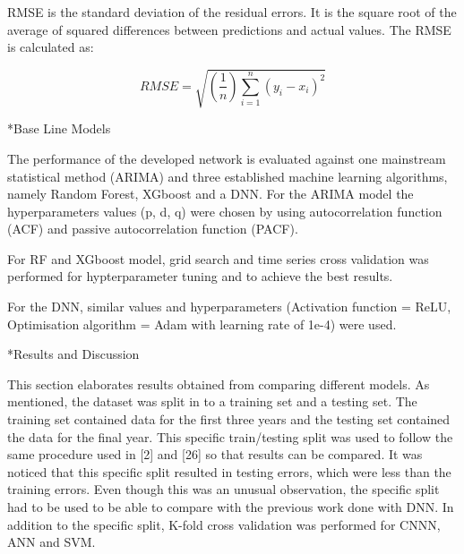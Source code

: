 \documentclass[twocolumn, a4paper,10pt]{article}
\makeatletter
\renewcommand\section{\@startsection{section}{1}{\z@}{0.25cm}{0.1cm}{\normalfont\large\bfseries}}
\renewcommand\subsubsection{\@startsection{subsection}{1}{\z@}{0.2cm}{0.1cm}{\normalfont\normalsize\itshape}}
\makeatother
\begin{document}
RMSE is the standard deviation of the residual errors. It is the square root of the average of squared differences between predictions and actual values. The RMSE is calculated as:

$$ RMSE = \sqrt{(\frac{1}{n})\sum_{i=1}^{n}(y_{i} - x_{i})^{2}} $$

\subsubsection*{Base Line Models}

The performance of the developed network is evaluated against one mainstream statistical method (ARIMA) and three established machine learning algorithms, namely Random Forest, XGboost and a DNN.
For the ARIMA model the hyperparameters values (p, d, q) were chosen by using autocorrelation function (ACF) and passive autocorrelation function (PACF).

For RF and XGboost model, grid search and time series cross validation was performed for hypterparameter tuning and to achieve the best results.

For the DNN, similar values and hyperparameters (Activation function = ReLU, Optimisation algorithm = Adam with learning rate of 1e-4) were used.


\section*{Results and Discussion}

This section elaborates results obtained from comparing different models. As mentioned, the dataset was split in to a training set and a testing set. The training set contained data for the first three years and the testing set contained the data for the final year. This specific train/testing split was used to follow the same procedure used in [2] and [26] so that results can be compared. It was noticed that this specific split resulted in testing errors, which were less than the training errors. Even though this was an unusual observation, the specific split had to be used to be able to compare with the previous work done with DNN. In addition to the specific split, K-fold cross validation was performed for CNNN, ANN and SVM.
\end{document}

